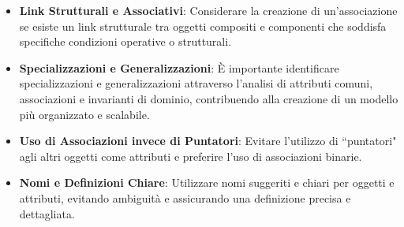 \begin{itemize}
  \item \textbf{Link Strutturali e Associativi}: Considerare la creazione di 
  un'associazione se esiste un link strutturale tra oggetti compositi e 
  componenti che soddisfa specifiche condizioni operative o strutturali.
  
  \item \textbf{Specializzazioni e Generalizzazioni}: È importante identificare 
  specializzazioni e generalizzazioni attraverso l'analisi di attributi comuni, 
  associazioni e invarianti di dominio, contribuendo alla creazione di un modello 
  più organizzato e scalabile.
  
  \item \textbf{Uso di Associazioni invece di Puntatori}: Evitare l'utilizzo 
  di ``puntatori" agli altri oggetti come attributi e preferire l'uso di 
  associazioni binarie.
  
  \item \textbf{Nomi e Definizioni Chiare}: Utilizzare nomi suggeriti e 
  chiari per oggetti e attributi, evitando ambiguità e assicurando una 
  definizione precisa e dettagliata.
\end{itemize}